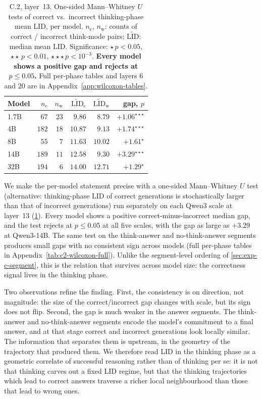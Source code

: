 \documentclass{article}
\theoremstyle{plain}
\theoremstyle{definition}
\theoremstyle{remark}
\begin{document}
\begin{table}[t]
    \centering
    \footnotesize
    \begin{tabular}{lrrrrr}
    \toprule
    Model & $n_{\text{c}}$ & $n_{\text{w}}$ & $\widetilde{\text{LID}}_{\text{c}}$ & $\widetilde{\text{LID}}_{\text{w}}$ & gap, $p$ \\
    \midrule
    1.7B & $67$  & $23$ & $9.86$  & $8.79$  & $+1.06^{\star\star\star}$ \\
    4B   & $182$ & $18$ & $10.87$ & $9.13$  & $+1.74^{\star\star\star}$ \\
    8B   & $55$  & $7$  & $11.63$ & $10.02$ & $+1.61^{\star}$ \\
    14B  & $189$ & $11$ & $12.58$ & $9.30$  & $+3.29^{\star\star\star}$ \\
    32B  & $194$ & $6$  & $14.00$ & $12.71$ & $+1.29^{\star}$ \\
    \bottomrule
    \end{tabular}
    \caption{C.2, layer~13. One-sided Mann--Whitney $U$ tests of correct vs.\ incorrect thinking-phase mean LID, per model. $n_{\text{c}}$, $n_{\text{w}}$: counts of correct / incorrect think-mode pairs; $\widetilde{\text{LID}}$: median mean LID. Significance: $\star\,p<0.05$, $\star\star\,p<0.01$, $\star\star\star\,p<10^{-3}$. \textbf{Every model shows a positive gap and rejects at $p\!\leq\!0.05$.} Full per-phase tables and layers $6$ and $20$ are in Appendix~\ref{app:wilcoxon-tables}.}
    \label{tab:c2-wilcoxon-layer13}
\end{table}

We make the per-model statement precise with a one-sided Mann--Whitney $U$ test (alternative: thinking-phase LID of correct generations is stochastically larger than that of incorrect generations) run separately on each Qwen3 scale at layer~13 (\cref{tab:c2-wilcoxon-layer13}). Every model shows a positive correct-minus-incorrect median gap, and the test rejects at $p\leq 0.05$ at all five scales, with the gap as large as $+3.29$ at Qwen3-14B. The same test on the think-answer and no-think-answer segments produces small gaps with no consistent sign across models (full per-phase tables in Appendix~\cref{tab:c2-wilcoxon-full}). Unlike the segment-level ordering of \cref{sec:exp-c-segment}, this is the relation that survives across model size: the correctness signal lives in the thinking phase.

Two observations refine the finding. First, the consistency is on {direction}, not {magnitude}: the size of the correct/incorrect gap changes with scale, but its sign does not flip. Second, the gap is much weaker in the answer segments. The think-answer and no-think-answer segments encode the model's commitment to a final answer, and at that stage correct and incorrect generations look locally similar. The information that separates them is upstream, in the geometry of the trajectory that produced them. We therefore read LID in the thinking phase as a geometric correlate of {successful} reasoning rather than of thinking per se: it is not that thinking carves out a fixed LID regime, but that the thinking trajectories which lead to correct answers traverse a richer local neighbourhood than those that lead to wrong ones.
\end{document}

